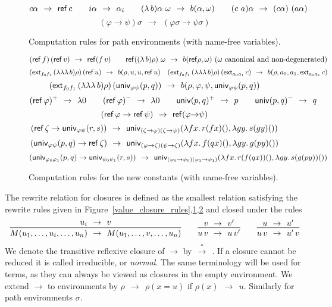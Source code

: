 \documentclass[10pt,a4paper]{article}
\newcommand{\red}{~~{\to}~~}
\newcommand{\unphsi}{{\univ_{\varphi\psi}}}
\newcommand{\unphis}{{\univ_{\varphi_0\varphi_1}}}
\newcommand{\unpsis}{{\univ_{\psi_0\psi_1}}}
\newcommand{\extfs}{{\ext_{f_0 f_1}}}
\newcommand{\extas}{{\ext_{a_0 a_1}}}
\newcommand{\rtr}{~~{\stackrel{*}{\to}}~~}
\newcommand{\Ref}{{\sf ref}}
\newcommand{\ext}{{\sf ext}}
\newcommand{\univ}{{\sf univ}}
\begin{document}
\begin{figure}[h]
\[
c\alpha \red \Ref\,c\quad\quad
i\alpha \red \alpha_i\quad\quad
(\lambda\,b)\alpha~\omega \red b(\alpha,\omega)\quad\quad
(c~a)\alpha \red (c\alpha)~(a\alpha)
\]
\[
(\varphi\to\psi)\sigma \red (\varphi\sigma\to\psi\sigma)
\]

\caption{Computation rules for path environments (with name-free variables).
\label{path_closure_rules}}
\end{figure}

\begin{figure}[h]
\[
(\Ref\,f)\,(\Ref\,v) \red \Ref (f\,v)\quad\quad
\Ref ((\lambda\,b)\rho)~\omega \red b(\Ref\rho,\omega)~\mbox{($\omega$ canonical and non-degenerated)}
\]
\[
(\extfs\,(\lambda\lambda\lambda\,b)\rho)\,(\Ref\,u) \red b (\rho,u,u,\Ref\,u)\quad
(\extfs\,(\lambda\lambda\lambda\,b)\rho)\,(\extas\,c) \red b (\rho,a_0,a_1,\extas\,c)
\]
\[
(\extfs\,(\lambda\lambda\lambda\,b)\rho)\,(\unphsi(p,q)) \red b (\rho,\varphi,\psi,\unphsi(p,q))
\]
\[
(\Ref\,\varphi)^+ \red \lambda 0\quad\quad
(\Ref\,\varphi)^- \red \lambda 0\quad\quad
\univ(p,q)^+ \red p\quad\quad
\univ(p,q)^- \red q
\]
\[
(\Ref\,\varphi\to\Ref\,\psi) \red \Ref(\varphi{\to}\psi)
\]
\[
(\Ref\,\zeta\to\unphsi(r,s)) \red
  \univ_{(\zeta{\to}\varphi)(\zeta{\to}\psi)}(\lambda fx.\,r(fx)(),\lambda gy.\,s(gy)())
\]
\[
(\unphsi(p,q)\to\Ref\,\zeta) \red
  \univ_{(\varphi{\to}\zeta)(\psi{\to}\zeta)}(\lambda fx.\,f(qx)(),\lambda gy.\,g(py)())
\]
\[
(\unphis(p,q)\to\unpsis(r,s)) \red
  \univ_{(\varphi_0{\to}\psi_0)(\varphi_1{\to}\psi_1)}(\lambda fx.\,r(f(qx))(),\lambda gy.\,s(g(py))())
\]

\caption{Computation rules for the new constants (with name-free variables).
\label{constant_rules}}
\end{figure}

\begin{definition}\label{rewrite_relation}
The rewrite relation for closures is defined as the smallest relation satisfying
the rewrite rules given in
Figure~\ref{value_closure_rules},\ref{path_closure_rules},\ref{constant_rules}
and closed under the rules
\[
\infer{M(u_1,\ldots,u_i,\ldots,u_n) \red M(u_1,\ldots,v,\ldots,u_n)}{u_i \red v}\quad\quad
\infer{u\,v \red u\,v'}{v \red v'}\quad\quad
\infer{u\,v \red u'\,v}{u \red u'}
\]
We denote the transitive reflexive closure of $\to$ by$\rtr$.
If a closure cannot be reduced it is called irreducible, or \emph{normal}.
The same terminology will be used for terms, as they can always be viewed
as closures in the empty environment.
We extend $\to$ to environments by $\rho\red\rho(x=u)$ if $\rho(x)\red u$. 
Similarly for path environments $\sigma$.
\end{definition}
\end{document}
